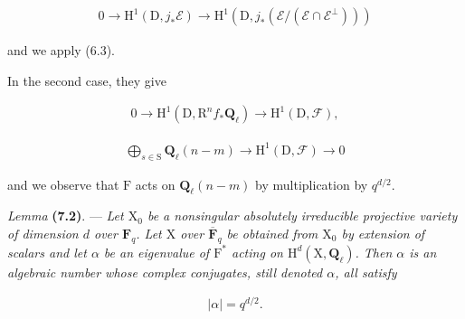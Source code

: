 \documentclass[10pt,leqno]{article}
\begin{document}
\begin{equation*}\begin{gathered}0 \longrightarrow  \mathrm{H}^{1}(\mathrm{D},j_{*}\mathcal{E} ) \longrightarrow  \mathrm{H}^{1}(\mathrm{D},j_{*}(\mathcal{E} /(\mathcal{E} \cap \mathcal{E} ^{\perp })))\end{gathered}\tag{7.1.3′}\end{equation*}

\noindent and we apply (6.3).\par

\noindent In the second case, they give\par

\begin{equation*}\begin{gathered}0 \longrightarrow  \mathrm{H}^{1}(\mathrm{D},\mathrm{R}^{n} f_{*}\mathbf{Q}_{\ell }) \longrightarrow  \mathrm{H}^{1}(\mathrm{D},\mathcal{F} ),\end{gathered}\tag{7.1.4′}\end{equation*}

\begin{equation*}\begin{gathered}\bigoplus\limits_{s\in \mathrm{S}}\mathbf{Q}_{\ell }(n- m) \longrightarrow  \mathrm{H}^{1}(\mathrm{D},\mathcal{F} ) \longrightarrow  0\end{gathered}\tag{7.1.5′}\end{equation*}

\noindent and we observe that \(\mathrm{F}\) acts on \(\mathbf{Q}_{\ell }(n- m)\) by multiplication by \(q^{d/2}\).\par

\noindent \emph{Lemma} \textbf{(7.2)}. — {\itshape Let \(\mathrm{X}_{0}\) be a nonsingular absolutely irreducible projective variety of dimension \(d\) over \(\mathbf{F}_{q}\). Let \(\mathrm{X}\) over \(\overline{\mathbf{F}}_{q}\) be obtained from \(\mathrm{X}_{0}\) by extension of scalars and let \(\alpha \) be an eigenvalue of \(\mathrm{F}^{*}\) acting on \(\mathrm{H}^{d}(\mathrm{X},\mathbf{Q}_{\ell })\). Then \(\alpha \) is an algebraic number whose complex conjugates, still denoted \(\alpha \), all satisfy}\par

\begin{equation*}\begin{gathered}|\alpha |=q^{d/2}.\end{gathered}\end{equation*}

\clearpage
\end{document}
